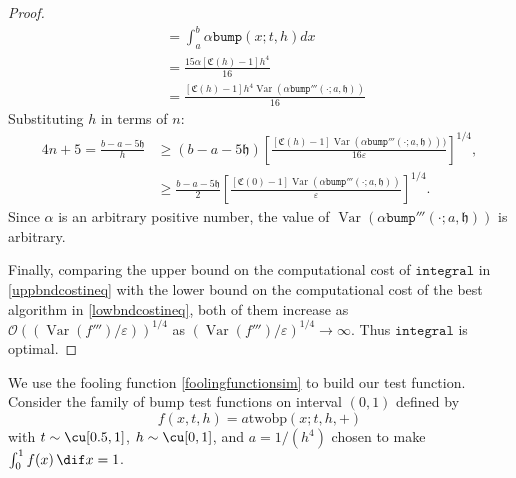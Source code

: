 \documentclass{iitthesis}
\DeclareMathOperator{\Var}{Var}
\theoremstyle{definition}
\theoremstyle{remark}
\begin{document}
\begin{proof}
\begin{subequations}
\begin{align*}
     &=\int_{a}^{b}\alpha\texttt{bump}(x;t,h)dx\\
     &=\frac{15\alpha[\mathfrak{C}(h)-1]h^4}{16}\\
     &=\frac{[\mathfrak{C}(h)-1]h^4\Var(\alpha\texttt{bump}'''(\cdot;a,\mathfrak{h}))}{16}
  \end{align*}
  \end{subequations}
  Substituting $h$  in terms of $n$:
      \begin{align*}
        4n+5=\frac{b-a-5\mathfrak{h}}{h}&\ge(b-a-5\mathfrak{h})\left[\frac{[\mathfrak{C}(h)-1]\Var(\alpha \texttt{bump}'''(\cdot;a,\mathfrak{h})))}{16\varepsilon}\right]^{1/4},\\
        &\ge\frac{b-a-5\mathfrak{h}}{2}\left[\frac{[\mathfrak{C}(0)-1]\Var(\alpha \texttt{bump}'''(\cdot;a,\mathfrak{h}))}{\varepsilon}\right]^{1/4}.
    \end{align*}
    Since $\alpha$ is an arbitrary positive number, the value of $\Var(\alpha \texttt{bump}'''(\cdot;a,\mathfrak{h}))$ is arbitrary.

    Finally, comparing the upper bound on the computational cost of $\texttt{integral}$ in \eqref{uppbndcostineq} with the lower bound on the computational cost of the best algorithm in \eqref{lowbndcostineq}, both of them increase as $\mathcal{O}((\Var(f''')/\varepsilon))^{1/4}$ as $(\Var(f''')/\varepsilon)^{1/4}\rightarrow \infty$. Thus $\texttt{integral}$ is optimal.
\end{proof}



We use the fooling function \eqref{foolingfunctionsim} to build our test function. Consider the family of bump test functions on interval $(0,1)$ defined by
\begin{equation}\label{testfun}
f(x,t,h)= a\text{twobp}(x;t,h,+)
\end{equation}
with  $t \sim \cu[0.5,1]$, $h \sim \cu[0,1]$, and $a=1/(h^4)$ chosen to make $\int_0^1 f(x) \, \dif x = 1$.
\end{document}
